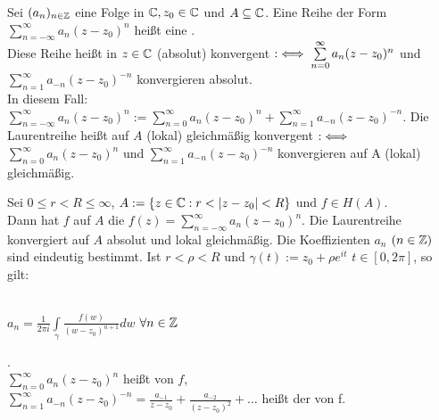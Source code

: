 \documentclass[a4paper,twoside,DIV15,BCOR12mm]{scrbook}
\def\gdw{\equizu}
\def\gdw{\equizu}
\begin{document}
\begin{definition}
Sei $(a_n)_{n \in \mathbb{Z}}$ eine Folge in $\mathbb{C}, z_0 \in \mathbb{C}$ und $A \subseteq
\mathbb{C}$. Eine Reihe der Form $\sum\limits_{n=-\infty}^{\infty} a_n(z-z_0)^n$ heißt eine
. \\
Diese Reihe heißt in $z \in \mathbb{C}$ (absolut) konvergent $: \gdw
\sum\limits_{n=0}^{\infty} a_n(z-z_0)^n$  und $\sum\limits_{n=1}^{\infty}
a_{-n}(z-z_0)^{-n}$ konvergieren absolut. \\ In diesem Fall: $\sum\limits_{n=-\infty}^{\infty}
a_n(z-z_0)^n := \sum\limits_{n=0}^{\infty} a_n(z-z_0)^n + \sum\limits_{n=1}^{\infty}
a_{-n}(z-z_0)^{-n}$. Die Laurentreihe heißt auf $A$ (lokal) gleichmäßig
konvergent $:\gdw$ $\sum\limits_{n=0}^{\infty} a_n(z-z_0)^n$ und $\sum\limits_{n=1}^{\infty}
a_{-n}(z-z_0)^{-n}$ konvergieren auf A (lokal) gleichmäßig.
\end{definition}

\begin{satz}
Sei $0 \leq r < R \leq \infty$, $A := \{z \in \mathbb{C}: r < |z-z_0| < R\}$ und $f
\in H(A).$ \\Dann hat $f$ auf $A$ die  
$f(z) = \sum\limits_{n=-\infty}^{\infty} a_n(z-z_0)^n$. Die Laurentreihe
konvergiert auf $A$ absolut und lokal gleichmäßig. Die Koeffizienten $a_n$ $(n
\in \mathbb{Z} )$ sind eindeutig bestimmt. Ist $r < \rho < R$ und $\gamma(t) := z_0 +
\rho e^{it}$ $t \in [0,2\pi]$, so gilt: \\ \\
\centerline{$a_n = \frac{1}{2\pi i} \int\limits_{\gamma} 
\frac{f(w)}{(w-z_0)^{n+1}} dw$ $\forall n \in \mathbb{Z}$}. \\
$\sum\limits_{n=0}^{\infty} a_n(z-z_0)^n$ heißt  von $f$, \\
$\sum\limits_{n=1}^{\infty} a_{-n}(z-z_0)^{-n} = \frac{a_{-1}}{z-z_0}+
\frac{a_{-2}}{(z-z_0)^2} + \ldots$ heißt der  von f.
\end{satz}
\end{document}
